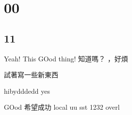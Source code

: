 
\chapter{00}

\section{11}

Yeah!
This
GOod thing! 知道嗎？
，好煩

試著寫一些新東西

hibydddedd
yes

GOod
希望成功
local
uu
sst
1232
overl